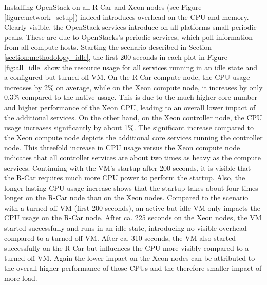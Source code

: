         \noindent Installing OpenStack on all R-Car and Xeon nodes (see Figure \ref{figure:network_setup}) indeed introduces overhead on the \ac{CPU} and memory.
        Clearly visible, the OpenStack services introduce on all platforms small periodic peaks.
        These are due to OpenStacks's periodic services, which poll information from all compute hosts.
        Starting the scenario described in Section \ref{section:methodology_idle}, the first 200 seconds in each plot in Figure \ref{fig:all_idle} show the resource usage for all services running in an idle state and a configured but turned-off VM.
        On the R-Car compute node, the \ac{CPU} usage increases by 2\% on average, while on the Xeon compute node, it increases by only 0.3\% compared to the native usage.
        This is due to the much higher core number and higher performance of the Xeon CPU, leading to an overall lower impact of the additional services. 
        On the other hand, on the Xeon controller node, the \ac{CPU} usage increases significantly by about 1\%.
        The significant increase compared to the Xeon compute node depicts the additional core services running the controller node.
        This threefold increase in CPU usage versus the Xeon compute node indicates that all controller services are about two times as heavy as the compute services.
        Continuing with the \ac{VM}'s startup after 200 seconds, it is visible that the R-Car requires much more \ac{CPU} power to perform the startup.
        Also, the longer-lasting \ac{CPU} usage increase shows that the startup takes about four times longer on the R-Car node than on the Xeon nodes.
        Compared to the scenario with a turned-off VM (first 200 seconds), an active but idle VM only impacts the \ac{CPU} usage on the R-Car node.
        After ca. 225 seconds on the Xeon nodes, the VM started successfully and runs in an idle state, introducing no visible overhead compared to a turned-off VM.
        After ca. 310 seconds, the VM also started successfully on the R-Car but influences the CPU more visibly compared to a turned-off VM.
        Again the lower impact on the Xeon nodes can be attributed to the overall higher performance of those CPUs and the therefore smaller impact of more load.
        
